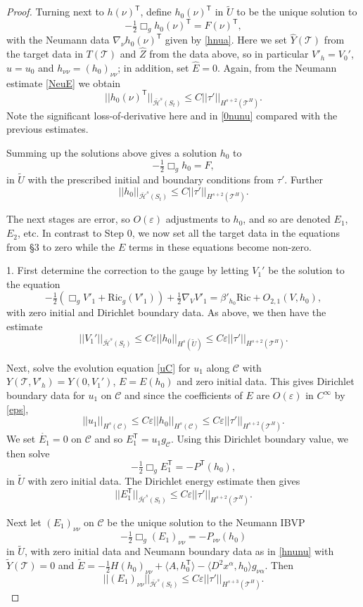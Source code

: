 \documentclass[10pt]{amsart}
\renewcommand{\a}{\alpha}
\renewcommand{\b}{\beta}
\newcommand{\e}{\varepsilon}
\newcommand{\cC}{{\mathcal C}}
\newcommand{\cT}{{\mathcal T}}
\newcommand{\cH}{{\mathcal H}}
\newcommand{\Ric}{\mathrm{Ric}}
\newcommand{\tT}{\mathsf{T}}
\newcommand{\be}{\begin{equation}}
\newcommand{\ee}{\end{equation}}
\renewcommand{\hat}{\widehat}
\newcommand{\<}{\langle}
\renewcommand{\>}{\rangle}
\newcommand{\w}{\widetilde}
\theoremstyle{plain}
\theoremstyle{remark}
\theoremstyle{definition}
\numberwithin{equation}{section}
\begin{document}
\begin{proof}
   Turning next to $h(\nu)^{\tT}$, define $h_0(\nu)^{\tT}$ in $\w U$ to be the unique solution to 
$$-\tfrac{1}{2}\Box_g h_0(\nu)^{\tT} = F(\nu)^{\tT},$$
with the Neumann data $\nabla_{\nu}h_0(\nu)^{\tT}$ given by \eqref{hnua}. Here we set $\hat Y(\cT)$ from 
the target data in $T(\cT)$ and $\hat Z$ from the data above, so in particular $V'_h = V_0'$, $u = u_0$ and $h_{\nu\nu} = (h_0)_{\nu\nu}$; in 
addition, set $\hat E = 0$. Again, from the Neumann estimate \eqref{NeuE} we obtain 
\be \label{0nua}
||h_0(\nu)^{\tT}||_{\bar \cH^s(S_t)} \leq C||\tau'||_{H^{s+2}(\cT^H)}.
\ee
Note the significant loss-of-derivative here and in \eqref{0nunu} compared with the previous estimates. 

 Summing up the solutions above gives a solution $h_0$ to 
\be \label{h0F}
-\tfrac{1}{2}\Box_g h_0 = F,
\ee
in $\w U$ with the prescribed initial and boundary conditions from $\tau'$. Further 
$$||h_0||_{\bar \cH^s(S_t)} \leq C||\tau'||_{H^{s+2}(\cT^H)}.$$

 The next stages are error, so $O(\e)$ adjustments to $h_0$, and so are denoted $E_1$, $E_2$, etc. In contrast to 
Step 0, we now set all the target data in the equations from \S 3 to zero while the $E$ terms in these equations become non-zero. 

1.  First determine the correction to the gauge by letting $V_1'$ be the solution to the equation
$$-\tfrac{1}{2}(\Box_g V'_1+ \Ric_g (V'_1)) + \tfrac{1}{2}\nabla_{V} V'_1 = \b'_{h_0} \Ric + O_{2,1}(V,h_0),$$
with zero initial and Dirichlet boundary data. As above, we then have the estimate 
$$||V_1'||_{\bar \cH^s(S_t)} \leq C\e ||h_0||_{H^s(\w U)} \leq C\e || \tau'||_{H^{s+2}(\cT^H)}.$$

  Next, solve the evolution equation \eqref{uC} for $u_1$ along $\cC$ with $Y(\cT, V'_h) = Y(0, V_1')$, $E = E(h_0)$ and zero initial data. This gives 
Dirichlet boundary data for $u_1$ on $\cC$ and since the coefficients of $E$ are $O(\e)$ in $C^{\infty}$ by \eqref{eps}, 
$$||u_1||_{H^s(\cC)} \leq C\e ||h_0||_{H^s(\cC)} \leq C\e ||\tau'||_{H^{s+2}(\cT^H)}.$$
We set $\ring{E_1} = 0$ on $\cC$ and so $E_1^{\tT} = u_1 g_{\cC}$. Using this Dirichlet boundary value, we then solve 
$$-\tfrac{1}{2}\Box_g E_1^{\tT} = -P^{\tT}(h_0),$$
in $\w U$ with zero initial data. The Dirichlet energy estimate then gives 
$$||E_1^{\tT}||_{\bar \cH^s(S_t)} \leq C \e ||\tau'||_{H^{s+2}(\cT^H)}.$$


Next let $(E_1)_{\nu \nu}$ on $\cC$ be the unique solution to the Neumann IBVP 
$$-\tfrac{1}{2}\Box_g (E_1)_{\nu \nu} = -P_{\nu \nu}(h_0)$$
in $\w U$, with zero initial data and Neumann boundary data as in \eqref{hnunu} with $\w Y(\cT) = 0$ and $\w E =  -\tfrac{1}{2}H (h_0)_{\nu\nu} + 
\<A, h_0^{\tT}\> - \<D^2 x^{\a}, h_0\>g_{\nu \a}$. Then  
$$||(E_1)_{\nu\nu}||_{\bar \cH^s(S_t)} \leq C \e ||\tau'||_{H^{s+3}(\cT^H)}.$$


\end{proof}
\end{document}
